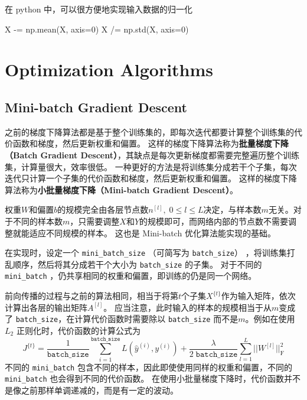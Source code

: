 在 python 中，可以很方便地实现输入数据的归一化
\begin{python}
X -= np.mean(X, axis=0)
X /= np.std(X, axis=0)
\end{python}

\section{Optimization Algorithms}

\subsection{Mini-batch Gradient Descent}

之前的梯度下降算法都是基于整个训练集的，即每次迭代都要计算整个训练集的代价函数和梯度，然后更新权重和偏置。
这样的梯度下降算法称为\textbf{批量梯度下降（Batch Gradient Descent）}，其缺点是每次更新梯度都需要完整遍历整个训练集，计算量很大，效率很低。
一种更好的方法是将训练集分成若干个子集，每次迭代只计算一个子集的代价函数和梯度，然后更新权重和偏置。
这样的梯度下降算法称为\textbf{小批量梯度下降（Mini-batch Gradient Descent）}。

\begin{hint}
    权重$W$和偏置$b$的规模完全由各层节点数$n^{[l]},\; 0 \leqslant l \leqslant L$决定，与样本数$m$无关。对于不同的样本数$m$，只需要调整$X$和$Y$的规模即可，而网络内部的节点数不需要调整就能适应不同规模的样本。
    这也是 Mini-batch 优化算法能实现的基础。
\end{hint}

在实现时，设定一个 \verb|mini_batch_size| （可简写为 \verb|batch_size|） ，将训练集打乱顺序，然后将其分成若干个大小为 \verb|batch_size| 的子集。
对于不同的 \verb|mini_batch| ，仍共享相同的权重和偏置，即训练的仍是同一个网络。

前向传播的过程与之前的算法相同，相当于将第$t$个子集$X^{\{t\}}$作为输入矩阵，依次计算出各层的输出矩阵$A^{[l]}$。
应当注意，此时输入的样本的规模相当于从$m$变成了 \verb|batch_size|，在计算代价函数时需要除以 \verb|batch_size| 而不是$m$。例如在使用 $L_2$ 正则化时，代价函数的计算公式为
\begin{equation}
    J^{\{t\}} = \frac{1}{\mathtt{batch\_size}}\sum_{i=1}^\mathtt{batch\_size} L(\hat{y}^{(i)}, y^{(i)}) + \frac{\lambda}{2\;\mathtt{batch\_size}}\sum_{l=1}^L||W^{[l]}||_{\mathrm{F}}^2
\end{equation}
不同的 \verb|mini_batch| 包含不同的样本，因此即使使用同样的权重和偏置，不同的 \verb|mini_batch| 也会得到不同的代价函数。
在使用小批量梯度下降时，代价函数并不是像之前那样单调递减的，而是有一定的波动。

